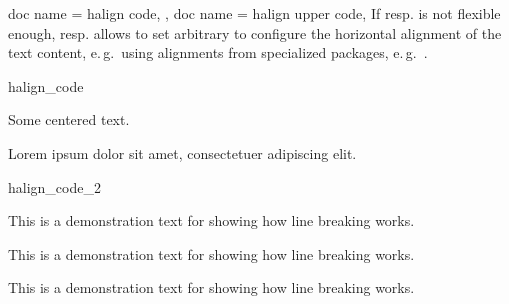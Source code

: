 \begin{docTcbKeys}[
    doc parameter   = {=\marg{code}},
    doc description = {no default},
    doc new         = 2022-07-07,
  ]
  {
    {
      doc name = halign code,
    },
    {
      doc name = halign upper code,
    }
  }
  If  resp.  is not flexible enough,
   resp.  allows to set
  arbitrary  to configure the horizontal alignment of the text content,
  e.\,g.\ using alignments from specialized packages, e.\,g.\ .

\begin{exdispExample}{halign_code}
\begin{tcolorbox}[colback=red!5!white,colframe=red!75!black,halign=center]
  Some centered text.
  \begin{tcolorbox}[colback=blue!5!white,colframe=blue!75!black,width=5cm,
      halign code=\noindent\justifying]
    Lorem ipsum dolor sit amet, consectetuer adipiscing elit.
  \end{tcolorbox}
\end{tcolorbox}
\end{exdispExample}

\begin{exdispExample}{halign_code_2}

\begin{tcolorbox}[adjusted title=Centering,halign code=\Centering]
This is a demonstration text for showing how line breaking works.
\end{tcolorbox}
\begin{tcolorbox}[adjusted title=RaggedRight,halign code=\RaggedRight]
This is a demonstration text for showing how line breaking works.
\end{tcolorbox}
\begin{tcolorbox}[adjusted title=RaggedLeft,halign code=\RaggedLeft]
This is a demonstration text for showing how line breaking works.
\end{tcolorbox}
\end{exdispExample}

\end{docTcbKeys}


